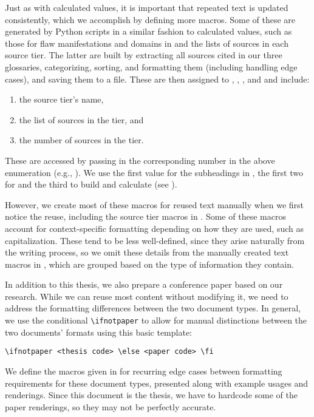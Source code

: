 \label{text-macros}
Just as with calculated values, it is important that repeated text is updated
consistently, which we accomplish by defining more macros. Some of these are
generated by Python scripts in a similar fashion to calculated values, such as
those for flaw manifestations and domains in  and the
lists of sources in each source tier. The latter are built by extracting all
sources cited in our three glossaries, categorizing, sorting, and formatting
them (including handling edge cases), and saving them to a file. These are then
assigned to , , , and
 and include:
\begin{enumerate}
    \item the source tier's name,
    \item the list of sources in the tier, and
    \item the number of sources in the tier.
\end{enumerate}
These are accessed by passing in the corresponding number in the above
enumeration (e.g., ). We use the first value for the
subheadings in , the first two for  and the
third to build  and calculate 
(see ).

\afterpage{
    \begin{landscape}
        
    \end{landscape}}

However, we create most of these macros for reused text manually when we first
notice the reuse, including the source tier macros in .
Some of these macros account for context-specific formatting depending on how
they are used, such as capitalization. These tend to be less well-defined,
since they arise naturally from the writing process, so we omit these details
from the manually created text macros in , which are
grouped based on the type of information they contain.



\label{paper-macros}
In addition to this thesis, we also prepare a conference paper based on our
research. While we can reuse most content without modifying it, we need to
address the formatting differences between the two document types.
In general, we use the conditional \texttt{\textbackslash ifnotpaper} to allow
for manual distinctions between the two documents' formats using this basic
template:
\begin{displayquote}
    \texttt{\textbackslash ifnotpaper <thesis code> \textbackslash else <paper code> \textbackslash fi}
\end{displayquote}
We define the macros given in  for recurring edge cases
between formatting requirements for these document types, presented along with
example usages and renderings. Since this document is the thesis, we have to
hardcode some of the paper renderings, so they may not be perfectly accurate.

